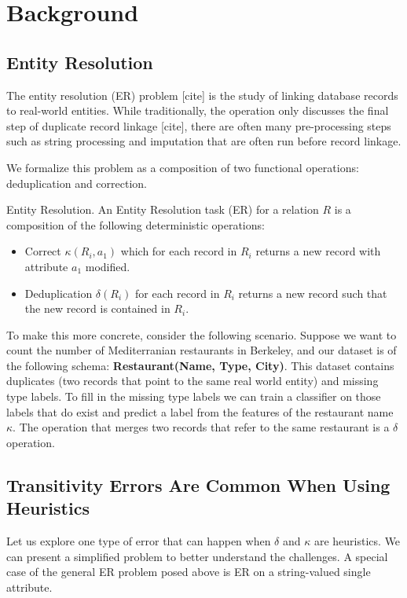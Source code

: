 \section{Background}

\subsection{Entity Resolution}
The entity resolution (ER) problem [cite] is the study of linking database records to real-world entities.
While traditionally, the operation only discusses the final step of duplicate record linkage [cite], there are often
many pre-processing steps such as string processing and imputation that are often run before record linkage.

We formalize this problem as a composition of two functional operations: deduplication and correction.
\begin{definition} Entity Resolution. 
An Entity Resolution task (ER) for a relation $R$ is a composition of the 
following deterministic operations:
\begin{itemize}
\item Correct $\kappa(R_i,a_{1})$ which for each record in $R_i$ returns a new record with attribute $a_{1}$ modified.
\item Deduplication $\delta(R_i)$ for each record in $R_i$ returns a new record such that the new record is contained in $R_i$.
\end{itemize}
\end{definition}

To make this more concrete, consider the following scenario. 
Suppose we want to count the number of Mediterranian restaurants in Berkeley, and 
our dataset is of the following schema: \textbf{Restaurant(Name, Type, City)}.
This dataset contains duplicates (two records that point to the same real world entity) and missing type labels.
To fill in the missing type labels we can train a classifier on those labels that do exist and predict a label from the features of the restaurant name $\kappa$.
The operation that merges two records that refer to the same restaurant is a $\delta$ operation.

\subsection{Transitivity Errors Are Common When Using Heuristics}
Let us explore one type of error that can happen when $\delta$ and $\kappa$ are heuristics.
We can present a simplified problem to better understand the challenges.
A special case of the general ER problem posed above is ER on a string-valued single attribute.


